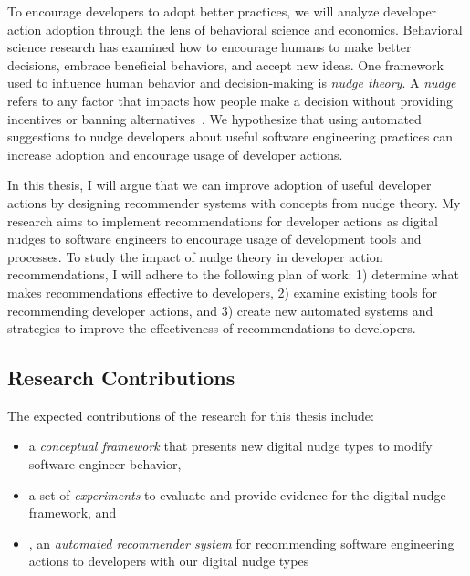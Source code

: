 To encourage developers to adopt better practices, we will analyze developer action adoption through the lens of behavioral science and economics. Behavioral science research has examined how to encourage humans to make better decisions, embrace beneficial behaviors, and accept new ideas. One framework used to influence human behavior and decision-making is \textit{nudge theory}. A \textit{nudge} refers to any factor that impacts how people make a decision without providing incentives or banning alternatives~\cite{sunstein2008nudge}. We hypothesize that using automated suggestions to nudge developers about useful software engineering practices can increase adoption and encourage usage of developer actions. 

In this thesis, I will argue that we can improve adoption of useful developer actions by designing recommender systems with concepts from nudge theory. My research aims to implement recommendations for developer actions as digital nudges to software engineers to encourage usage of development tools and processes. To study the impact of nudge theory in developer action recommendations, I will adhere to the following plan of work: 1) determine what makes recommendations effective to developers, 2) examine existing tools for recommending developer actions, and 3) create new automated systems and strategies to improve the effectiveness of recommendations to developers.

\subsection{Research Contributions}

The expected contributions of the research for this thesis include:

\begin{itemize}
    \item a \textit{conceptual framework} that presents new digital nudge types to modify software engineer behavior,
    \item a set of \textit{experiments} to evaluate and provide evidence for the digital nudge framework, and
    \item \TOOL, an \textit{automated recommender system} for recommending software engineering actions to developers with our digital nudge types
\end{itemize}

